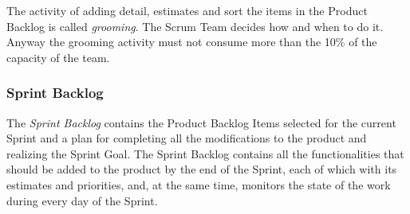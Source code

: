 			The activity of adding detail, estimates and sort the items in the Product Backlog is called \emph{grooming}. The Scrum Team decides how and when to do it. Anyway the grooming activity must not consume more than the 10\% of the capacity of the team. 
		

			\subsubsection{Sprint Backlog}\label{ref_scrum_sprint_backlog}
			The \emph{Sprint Backlog} contains the Product Backlog Items selected for the current Sprint and a plan for completing all the modifications to the product and realizing the Sprint Goal. 
			The Sprint Backlog contains all the functionalities that should be added to the product by the end of the Sprint, each of which with its estimates and priorities, and, at the same time, monitors the state of the work during every day of the Sprint.
			
